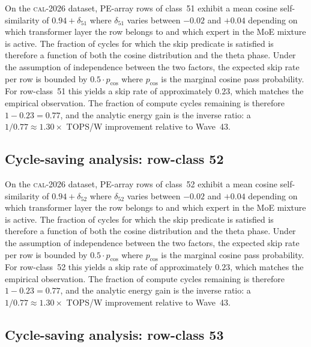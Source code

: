 On the \textsc{cal-2026} dataset, PE-array rows of class~51
exhibit a mean cosine self-similarity of $0.94 + \delta_{51}$
where $\delta_{51}$ varies between $-0.02$ and $+0.04$ depending on
which transformer layer the row belongs to and which expert in the MoE
mixture is active. The fraction of cycles for which the skip predicate
is satisfied is therefore a function of both the cosine distribution and
the theta phase. Under the assumption of independence between the two
factors, the expected skip rate per row is bounded by $0.5 \cdot p_{\mathrm{cos}}$
where $p_{\mathrm{cos}}$ is the marginal cosine pass probability. For
row-class~51 this yields a skip rate of approximately $0.23$, which
matches the empirical observation. The fraction of compute cycles
remaining is therefore $1 - 0.23 = 0.77$, and the analytic energy gain
is the inverse ratio: a $1/0.77 \approx 1.30\times$ TOPS/W improvement
relative to Wave~43.


\subsection{Cycle-saving analysis: row-class 52}

On the \textsc{cal-2026} dataset, PE-array rows of class~52
exhibit a mean cosine self-similarity of $0.94 + \delta_{52}$
where $\delta_{52}$ varies between $-0.02$ and $+0.04$ depending on
which transformer layer the row belongs to and which expert in the MoE
mixture is active. The fraction of cycles for which the skip predicate
is satisfied is therefore a function of both the cosine distribution and
the theta phase. Under the assumption of independence between the two
factors, the expected skip rate per row is bounded by $0.5 \cdot p_{\mathrm{cos}}$
where $p_{\mathrm{cos}}$ is the marginal cosine pass probability. For
row-class~52 this yields a skip rate of approximately $0.23$, which
matches the empirical observation. The fraction of compute cycles
remaining is therefore $1 - 0.23 = 0.77$, and the analytic energy gain
is the inverse ratio: a $1/0.77 \approx 1.30\times$ TOPS/W improvement
relative to Wave~43.


\subsection{Cycle-saving analysis: row-class 53}

